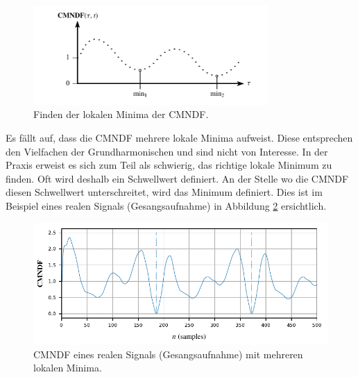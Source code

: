 \begin{figure}
	\centering
	\includegraphics[width=0.8\textwidth]{papers/autotune/images/CMNDF_Minimum.pdf}
	\caption{Finden der lokalen Minima der CMNDF.}
    \label{autotune:fig:cmndfMinimum}
\end{figure}

Es fällt auf, dass die CMNDF mehrere lokale Minima aufweist.
Diese entsprechen den Vielfachen der Grundharmonischen und sind nicht von Interesse.
In der Praxis erweist es sich zum Teil als schwierig, das richtige lokale Minimum zu finden.
Oft wird deshalb ein Schwellwert definiert.
An der Stelle wo die CMNDF diesen Schwellwert unterschreitet, wird das Minimum definiert.
Dies ist im Beispiel eines realen Signals (Gesangsaufnahme) in Abbildung \ref{autotune:fig:cmndfRealSignal} ersichtlich.
\begin{figure}
	\centering
	\includegraphics[width=\textwidth]{papers/autotune/images/Example-CMNDF.pdf}
	\caption{CMNDF eines realen Signals (Gesangsaufnahme) mit mehreren lokalen Minima.}
    \label{autotune:fig:cmndfRealSignal}
\end{figure}

